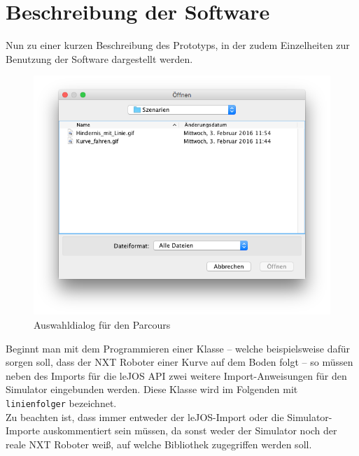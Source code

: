 \documentclass[paper=a4, DIV=calc, BCOR=15mm, twoside=on, onecolumn=on, open = right, titlepage =on, parskip =half, headsepline = on, footsepline = on, chapterprefix = off, appendixprefix = off, fontsize = 12pt, numbers = noenddot, abstract = on]{scrbook}
\begin{document}
\par \singlespacing
\section{Beschreibung der Software}
\onehalfspacing

Nun zu einer kurzen Beschreibung des Prototyps, in der zudem Einzelheiten zur Benutzung der Software dargestellt werden.



\begin{figure}[htbp]
\centering
\includegraphics[scale=0.6]{images/dialog_szenarien.png} 
\caption{Auswahldialog für den Parcours}
\label{fig:auswahldialog}
\end{figure}

Beginnt man mit dem Programmieren einer Klasse -- welche beispielsweise dafür sorgen soll, dass der NXT Roboter einer Kurve auf dem Boden folgt -- so müssen neben des Imports für die leJOS API zwei weitere Import-Anweisungen für den Simulator eingebunden werden. Diese Klasse wird im Folgenden mit \texttt{linienfolger} bezeichnet.\\
Zu beachten ist, dass immer entweder der leJOS-Import oder die Simulator-Importe auskommentiert sein müssen, da sonst weder der Simulator noch der reale NXT Roboter weiß, auf welche Bibliothek zugegriffen werden soll.
\end{document}
